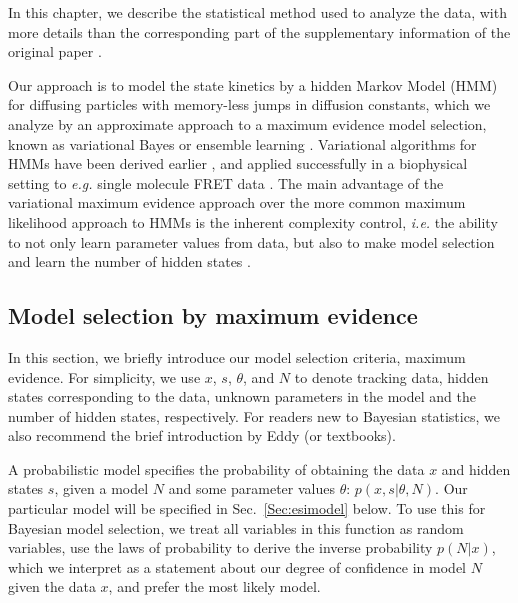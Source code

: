 In this chapter, we describe the statistical method used to analyze
the data, with more details than the corresponding part of the
supplementary information of the original paper \cite{Persson2013}.


Our approach is to model the state kinetics by a hidden Markov Model
(HMM) for diffusing particles with memory-less jumps in diffusion
constants, which we analyze by an approximate approach to a maximum
evidence model selection, known as variational Bayes or ensemble
learning \cite{Mackay2003,Bishop2006}. Variational algorithms for HMMs
have been derived
earlier \cite{Mackay1997,Ghahramani2002,Beal2003,Bronson2009,Bronson2010},
and applied successfully in a biophysical setting to \textit{e.g.}
single molecule FRET data \cite{Bronson2009,Bronson2010}. The main
advantage of the variational maximum evidence approach over the more
common maximum likelihood approach to HMMs is the inherent complexity
control, \textit{i.e.} the ability to not only learn parameter values
from data, but also to make model selection and learn the number of
hidden states \cite{Bronson2010}.


\subsection{Model selection by maximum evidence}
In this section, we briefly introduce our model selection criteria,
maximum evidence.  For simplicity, we use $x$, $s$, $\theta$, and $N$
to denote tracking data, hidden states corresponding to the data,
unknown parameters in the model and the number of hidden states,
respectively. For readers new to Bayesian statistics, we also
recommend the brief introduction by Eddy \cite{Eddy2004} (or
textbooks\cite{Mackay2003,Bishop2006}).

A probabilistic model specifies the probability of obtaining the data
$x$ and hidden states $s$, given a model $N$ and some parameter values
$\theta$: $p(x,s|\theta,N)$. Our particular model will be specified in
Sec.~\ref{Sec:esimodel} below.  To use this for Bayesian model
selection, we treat all variables in this function as random
variables, use the laws of probability to derive the inverse
probability $p(N|x)$, which we interpret as a statement about our
degree of confidence in model $N$ given the data $x$, and prefer the
most likely model.

